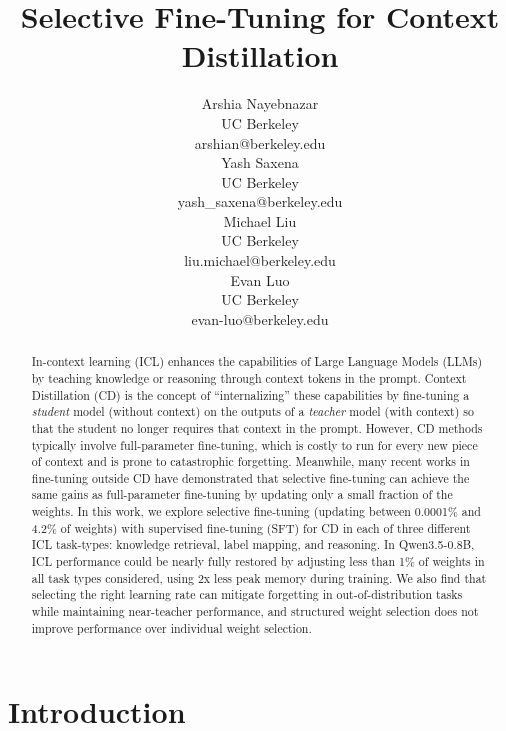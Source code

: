\documentclass{article} %
\title{Selective Fine-Tuning for Context Distillation}
\author{
Arshia Nayebnazar \\
UC Berkeley \\
arshian@berkeley.edu \\
\And
Yash Saxena \\
UC Berkeley \\
yash\_saxena@berkeley.edu \\
\AND
Michael Liu \\
UC Berkeley \\
liu.michael@berkeley.edu \\
\And
Evan Luo \\
UC Berkeley \\
evan-luo@berkeley.edu \\
}
\begin{document}
\maketitle

\begin{abstract}
In-context learning (ICL) enhances the capabilities of Large Language Models (LLMs) by teaching knowledge or reasoning through context tokens in the prompt. Context Distillation (CD) is the concept of ``internalizing'' these capabilities by fine-tuning a \emph{student} model (without context) on the outputs of a \emph{teacher} model (with context) so that the student no longer requires that context in the prompt. However, CD methods typically involve full-parameter fine-tuning, which is costly to run for every new piece of context and is prone to catastrophic forgetting. Meanwhile, many recent works in fine-tuning outside CD have demonstrated that selective fine-tuning can achieve the same gains as full-parameter fine-tuning by updating only a small fraction of the weights. In this work, we explore selective fine-tuning (updating between 0.0001\% and 4.2\% of weights) with supervised fine-tuning (SFT) for CD in each of three different ICL task-types: knowledge retrieval, label mapping, and reasoning. In Qwen3.5-0.8B, ICL performance could be nearly fully restored by adjusting less than 1\% of weights in all task types considered, using 2x less peak memory during training. We also find that selecting the right learning rate can mitigate forgetting in out-of-distribution tasks while maintaining near-teacher performance, and structured weight selection does not improve performance over individual weight selection.
\end{abstract}

\section{Introduction}
\label{sec:intro}
\end{document}
